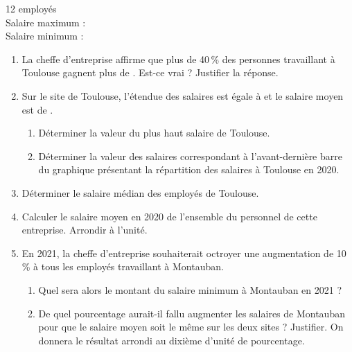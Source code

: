 \begin{exercice}[CRPE 2021 G2]
\begin{minipage}{5cm}
\begin{center}
{{            12 employés \\
            Salaire maximum :  \\
            Salaire minimum :  \\
         }}
      \end{center}
   \end{minipage}
   \begin{enumerate}
      \item La cheffe d’entreprise affirme que plus de 40\,\% des personnes travaillant à Toulouse gagnent plus de . Est-ce vrai ? Justifier la réponse.
      \item Sur le site de Toulouse, l’étendue des salaires est égale à  et le salaire moyen est de .
         \begin{enumerate}
            \item Déterminer la valeur du plus haut salaire de Toulouse.
            \item Déterminer la valeur des salaires correspondant à l’avant-dernière barre du graphique présentant la répartition des salaires à Toulouse en 2020.
         \end{enumerate}
      \item Déterminer le salaire médian des employés de Toulouse.
      \item Calculer le salaire moyen en 2020 de l’ensemble du personnel de cette entreprise. Arrondir à l’unité.
      \item En 2021, la cheffe d’entreprise souhaiterait octroyer une augmentation de 10\,\% à tous les employés travaillant à Montauban.
         \begin{enumerate}
            \item Quel sera alors le montant du salaire minimum à Montauban en 2021 ?
            \item De quel pourcentage aurait-il fallu augmenter les salaires de Montauban pour que le salaire moyen soit le même sur les deux sites ? Justifier. On donnera le résultat arrondi au dixième d’unité de pourcentage.
         \end{enumerate}
   \end{enumerate}
\end{exercice}

